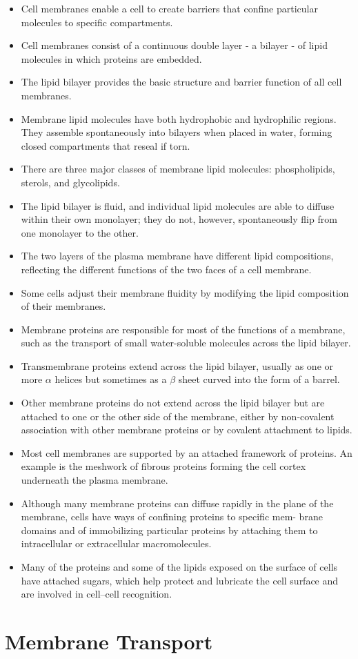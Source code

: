 \begin{itemize}
\item Cell membranes enable a cell to create barriers that confine particular 
molecules to specific compartments.
\item Cell membranes consist of a continuous double layer - a bilayer - of
lipid molecules in which proteins are embedded.
\item The lipid bilayer provides the basic structure and barrier function of
all cell membranes.
\item Membrane lipid molecules have both hydrophobic and hydrophilic
regions. They assemble spontaneously into bilayers when placed in
water, forming closed compartments that reseal if torn.
\item There are three major classes of membrane lipid molecules: phospholipids, 
sterols, and glycolipids.
\item The lipid bilayer is fluid, and individual lipid molecules are able to
diffuse within their own monolayer; they do not, however, spontaneously 
flip from one monolayer to the other.
\item The two layers of the plasma membrane have different lipid compositions, 
reflecting the different functions of the two faces of a cell
membrane.
\item Some cells adjust their membrane fluidity by modifying the lipid composition 
of their membranes.
\item Membrane proteins are responsible for most of the functions of a
membrane, such as the transport of small water-soluble molecules
across the lipid bilayer.
\item Transmembrane proteins extend across the lipid bilayer, usually as
one or more $\alpha$ helices but sometimes as a $\beta$ sheet curved into the
form of a barrel.
\item Other membrane proteins do not extend across the lipid bilayer but
are attached to one or the other side of the membrane, either by non-covalent 
association with other membrane proteins or by covalent
attachment to lipids.
\item Most cell membranes are supported by an attached framework of
proteins. An example is the meshwork of fibrous proteins forming the
cell cortex underneath the plasma membrane.
\item Although many membrane proteins can diffuse rapidly in the plane of
the membrane, cells have ways of confining proteins to specific mem-
brane domains and of immobilizing particular proteins by attaching
them to intracellular or extracellular macromolecules.
\item Many of the proteins and some of the lipids exposed on the surface of
cells have attached sugars, which help protect and lubricate the cell
surface and are involved in cell–cell recognition.
\end{itemize}

\chapter{Membrane Transport}
